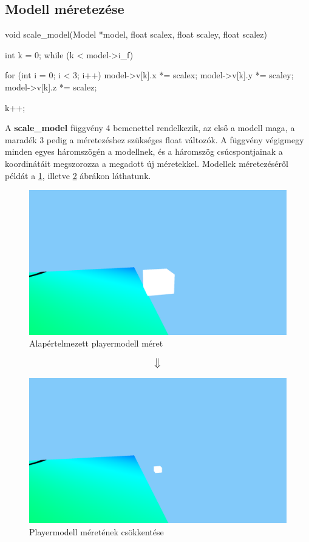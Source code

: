 \subsection{Modell méretezése}

\begin{cpp}
void scale_model(Model *model, float scalex, float scaley, 
float scalez)
{
    int k = 0;
    while (k < model->i_f)
    {
        for (int i = 0; i < 3; i++)
        {
            model->v[k].x *= scalex;
            model->v[k].y *= scaley;
            model->v[k].z *= scalez;
        }
			
        k++;
    }
}
\end{cpp}

A \textbf{scale\_model} függvény 4 bemenettel rendelkezik, az első a modell maga, a maradék 3 pedig a méretezéshez szükséges float változók. A függvény végigmegy minden egyes háromszögén a modellnek, és a háromszög csúcspontjainak a koordinátáit megszorozza a megadott új méretekkel. Modellek méretezéséről példát a \ref{fig:meret_1}, illetve \ref{fig:meret_2} ábrákon láthatunk.
\newpage

\begin{figure}[h]
	\centering
	\includegraphics[width=13truecm, height=7truecm]{images/modell_4.3.1.1.png}
	\caption{Alapértelmezett playermodell méret}
	\label{fig:meret_1}
\end{figure}

	$$\big\Downarrow$$
	
	
\begin{figure}[h]
		\centering
		\includegraphics[width=13truecm, height=7truecm]{images/modell_4.3.1.3.png}
		\caption{Playermodell méretének csökkentése}
		\label{fig:meret_2}
\end{figure}


